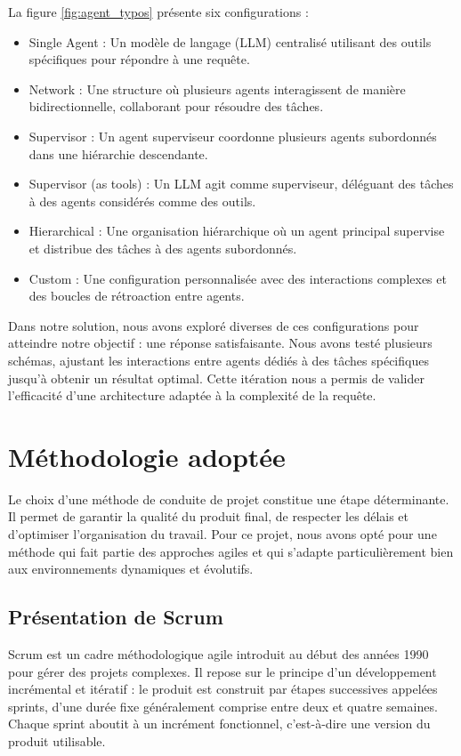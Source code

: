 La figure \ref{fig:agent_typos} présente six configurations :
\begin{itemize}[label=\textbullet]
    \item Single Agent : Un modèle de langage (LLM) centralisé utilisant des outils spécifiques pour répondre à une requête.
    \item Network : Une structure où plusieurs agents interagissent de manière bidirectionnelle, collaborant pour résoudre des tâches.
    \item Supervisor : Un agent superviseur coordonne plusieurs agents subordonnés dans une hiérarchie descendante.
    \item Supervisor (as tools) : Un LLM agit comme superviseur, déléguant des tâches à des agents considérés comme des outils.
    \item Hierarchical : Une organisation hiérarchique où un agent principal supervise et distribue des tâches à des agents subordonnés.
    \item Custom : Une configuration personnalisée avec des interactions complexes et des boucles de rétroaction entre agents.
\end{itemize}

Dans notre solution, nous avons exploré diverses de ces configurations pour atteindre notre objectif : une réponse satisfaisante. Nous avons testé plusieurs schémas, ajustant les interactions entre agents dédiés à des tâches spécifiques jusqu'à obtenir un résultat optimal. Cette itération nous a permis de valider l'efficacité d'une architecture adaptée à la complexité de la requête.
\section{Méthodologie adoptée}

Le choix d’une méthode de conduite de projet constitue une étape déterminante. Il permet de garantir la qualité du produit final, de respecter les délais et d’optimiser l’organisation du travail. Pour ce projet, nous avons opté pour une méthode qui fait partie des approches agiles et qui s’adapte particulièrement bien aux environnements dynamiques et évolutifs.
\subsection{Présentation de Scrum}

Scrum \cite{scrum_book} est un cadre méthodologique agile introduit au début des années 1990 pour gérer des projets complexes. Il repose sur le principe d’un développement incrémental et itératif : le produit est construit par étapes successives appelées sprints, d’une durée fixe généralement comprise entre deux et quatre semaines. Chaque sprint aboutit à un incrément fonctionnel, c’est-à-dire une version du produit utilisable.\par

